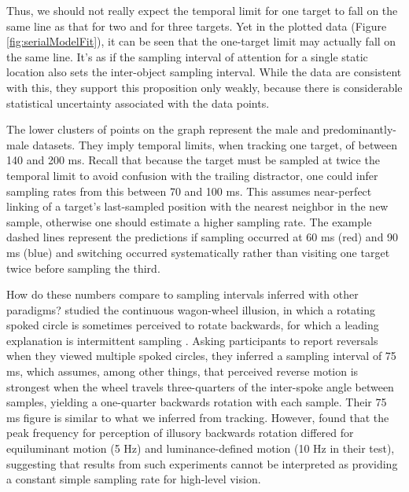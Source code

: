 \documentclass[
]{book}
\begin{document}
Thus, we should not really expect the temporal limit for one target to fall on the same line as that for two and for three targets. Yet in the plotted data (Figure \ref{fig:serialModelFit}), it can be seen that the one-target limit may actually fall on the same line. It's as if the sampling interval of attention for a single static location also sets the inter-object sampling interval. While the data are consistent with this, they support this proposition only weakly, because there is considerable statistical uncertainty associated with the data points.

The lower clusters of points on the graph represent the male and predominantly-male datasets. They imply temporal limits, when tracking one target, of between 140 and 200 ms. Recall that because the target must be sampled at twice the temporal limit to avoid confusion with the trailing distractor, one could infer sampling rates from this between 70 and 100 ms. This assumes near-perfect linking of a target's last-sampled position with the nearest neighbor in the new sample, otherwise one should estimate a higher sampling rate. The example dashed lines represent the predictions if sampling occurred at 60 ms (red) and 90 ms (blue) and switching occurred systematically rather than visiting one target twice before sampling the third.

How do these numbers compare to sampling intervals inferred with other paradigms? \citet{macdonaldAttentionalSamplingMultiple2013} studied the continuous wagon-wheel illusion, in which a rotating spoked circle is sometimes perceived to rotate backwards, for which a leading explanation is intermittent sampling \citep{holcombeAreThereCracks2014}. Asking participants to report reversals when they viewed multiple spoked circles, they inferred a sampling interval of 75 ms, which assumes, among other things, that perceived reverse motion is strongest when the wheel travels three-quarters of the inter-spoke angle between samples, yielding a one-quarter backwards rotation with each sample. Their 75 ms figure is similar to what we inferred from tracking. However, \citet{arnoldIllusoryMotionReversals2014} found that the peak frequency for perception of illusory backwards rotation differed for equiluminant motion (5 Hz) and luminance-defined motion (10 Hz in their test), suggesting that results from such experiments cannot be interpreted as providing a constant simple sampling rate for high-level vision.
\end{document}
